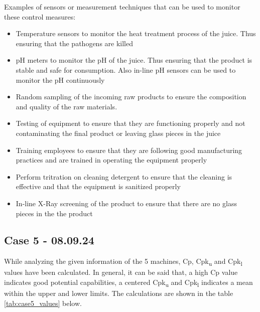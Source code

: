 \vspace{1\baselineskip}

Examples of sensors or measurement techniques that can be used to monitor these control measures:
\begin{itemize}
    \item Temperature sensors to monitor the heat treatment process of the juice. Thus ensuring that the pathogens are killed
    \item pH meters to monitor the pH of the juice. Thus ensuring that the product is stable and safe for consumption. Also in-line pH sensors can be used to monitor the pH continuously
    \item Random sampling of the incoming raw products to ensure the composition and quality of the raw materials. 
    \item Testing of equipment to ensure that they are functioning properly and not contaminating the final product or leaving glass pieces in the juice
    \item Training employees to ensure that they are following good manufacturing practices and are trained in operating the equipment properly
    \item Perform tritration on cleaning detergent to ensure that the cleaning is effective and that the equipment is sanitized properly
    \item In-line X-Ray screening of the product to ensure that there are no glass pieces in the the product
\end{itemize}




\newpage
\subsection{Case 5 - 08.09.24}
While analyzing the given information of the 5 machines, Cp, Cpk\textsubscript{u} and Cpk\textsubscript{l} values have been calculated. In general, it can be said that, a high Cp value indicates good potential capabilities, a centered Cpk\textsubscript{u} and Cpk\textsubscript{l} indicates a mean within the upper and lower limits. The calculations are shown in the table \ref*{tab:case5_values} below.

